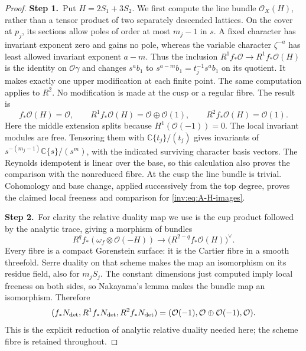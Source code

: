 \begin{proof}
\par\smallskip\noindent\textbf{Step 1.}\ Put $H=2S_1+3S_2$.  We first compute the line bundle $\mathcal O_X(H)$,
rather than a tensor product of two separately descended lattices.
On the cover at $p_j$, its sections allow poles of order at most $m_j-1$
in $s$.  A fixed character has invariant exponent zero and gains no
pole, whereas the variable character $\zeta^{-a}$ has least allowed
invariant exponent $a-m$.  Thus the inclusion
$R^1f_*\mathcal O\to R^1f_*\mathcal O(H)$ is the identity on $\mathcal O\gamma$ and
changes $s^ab_1$ to $s^{a-m}b_1=t_j^{-1}s^ab_1$ on its quotient.
It makes exactly one upper modification at each finite point.
The same computation applies to $R^2$.  No modification is made at
the cusp or a regular fibre.  The result is
\begin{equation}\label{inv:eq:A-H-images}
f_*\mathcal O(H)=\mathcal O,\qquad
R^1f_*\mathcal O(H)=\mathcal O\oplus\mathcal O(1),\qquad
R^2f_*\mathcal O(H)=\mathcal O(1).
\end{equation}
Here the middle extension splits because $H^1(\mathcal O(-1))=0$.
The local invariant modules are free.  Tensoring them with
$\mathbb C\{t_j\}/(t_j)$ gives invariants of
$s^{-(m_j-1)}\mathbb C\{s\}/(s^m)$, with the indicated surviving character
basis vectors.  The Reynolds idempotent is linear over the base,
so this calculation also proves the comparison with the nonreduced
fibre.  At the cusp the line bundle is trivial.  Cohomology and base
change, applied successively from the top degree, proves the claimed
local freeness and comparison for \eqref{inv:eq:A-H-images}.

\par\smallskip\noindent\textbf{Step 2.}\ For clarity the relative duality map we use is the cup product followed
by the analytic trace, giving a morphism of bundles
\[
R^qf_*(\omega_f\otimes\mathcal O(-H))\longrightarrow
\bigl(R^{2-q}f_*\mathcal O(H)\bigr)^\vee.
\]
Every fibre is a compact Gorenstein surface: it is the Cartier fibre
in a smooth threefold.  Serre duality on that scheme makes the map
an isomorphism on its residue field, also for $m_jS_j$.  The constant
dimensions just computed imply local freeness on both sides, so
Nakayama's lemma makes the bundle map an isomorphism.  Therefore
\begin{equation}\label{inv:eq:A-N-images}
(f_*N_{\rm det},R^1f_*N_{\rm det},R^2f_*N_{\rm det})
=(\mathcal O(-1),\mathcal O\oplus\mathcal O(-1),\mathcal O).
\end{equation}
This is the explicit reduction of analytic relative duality needed
here; the scheme fibre is retained throughout.


\end{proof}
